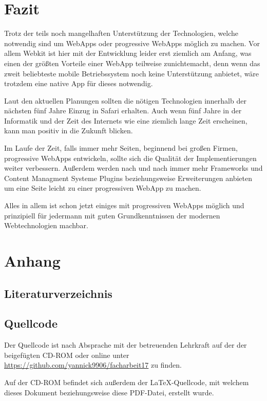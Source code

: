 \documentclass[a4paper,12pt,ngerman,listof=numbered]{scrartcl}      %
\begin{document}
	\section{Fazit}
	Trotz der teils noch mangelhaften Unterstützung der Technologien, welche notwendig sind um WebApps oder progressive WebApps möglich zu machen. Vor allem Webkit ist hier mit der Entwicklung leider erst ziemlich am Anfang, was einen der größten Vorteile einer WebApp teilweise zunichtemacht, denn wenn das zweit beliebteste mobile Betriebssystem noch keine Unterstützung anbietet, wäre trotzdem eine native App für dieses notwendig.\par
	Laut den aktuellen Planungen sollten die nötigen Technologien innerhalb der nächsten fünf Jahre Einzug in Safari erhalten. Auch wenn fünf Jahre in der Informatik und der Zeit des Internets wie eine ziemlich lange Zeit erscheinen, kann man positiv in die Zukunft blicken.\par
	Im Laufe der Zeit, falls immer mehr Seiten, beginnend bei großen Firmen, progressive WebApps entwickeln, sollte sich die Qualität der Implementierungen weiter verbessern. Außerdem werden nach und nach immer mehr Frameworks und Content Managment Systeme Plugins beziehungsweise Erweiterungen anbieten um eine Seite leicht zu einer progressiven WebApp zu machen.\par
	Alles in allem ist schon jetzt einiges mit progressiven WebApps möglich und prinzipiell für jedermann mit guten Grundkenntnissen der modernen Webtechnologien machbar.\par
	
	
	\newpage
	\section{Anhang}
	\subsection{Literaturverzeichnis}
	\printbibliography[heading=none]
	
	\subsection{Quellcode}
	Der Quellcode ist nach Absprache mit der betreuenden Lehrkraft auf der der beigefügten CD-ROM oder online unter \url{https://github.com/yannick9906/facharbeit17} zu finden.\par
	Auf der CD-ROM befindet sich außerdem der \LaTeX-Quellcode, mit welchem dieses Dokument beziehungsweise diese PDF-Datei, erstellt wurde.
	
\end{document}
